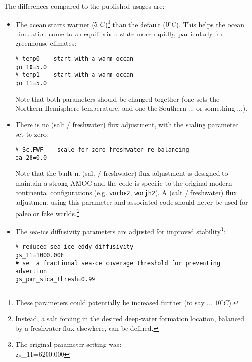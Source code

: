 \begin{itemize}[noitemsep]
The differences compared to the published usages are:
\begin{itemize}[noitemsep]
\vspace{1mm}
\item The ocean starts warmer (\(5^{\circ}C\))\footnote{These parameters could potentially be increased further (to say ...  \(10^{\circ}C\)).} than the default (\(0^{\circ}C\)). This helps the ocean circulation come to an equilibrium state more rapidly, particularly for greenhouse climates:
\small\vspace{-2pt}\begin{verbatim}
# temp0 -- start with a warm ocean
go_10=5.0
# temp1 -- start with a warm ocean
go_11=5.0
\end{verbatim}\vspace{-2pt}\normalsize
Note that both parameters should be changed together (one sets the Northern Hemisphere temperature, and one the Southern ... or something ...).
\vspace{1mm}
\item There is no (salt / freshwater) flux adjustment, with the scaling parameter set to zero:
\small\vspace{-2pt}\begin{verbatim}
# SclFWF -- scale for zero freshwater re-balancing
ea_28=0.0
\end{verbatim}\vspace{-2pt}\normalsize
Note that the built-in (salt / freshwater) flux adjustment is designed to maintain a strong AMOC and the code is specific to the original modern continental configurations (e.g. \texttt{worbe2}, \texttt{worjh2}). A (salt / freshwater) flux adjustment using this parameter and associated code should never be used for paleo or fake worlds.\footnote{Instead, a salt forcing in the desired deep-water formation location, balanced by a freshwater flux elsewhere, can be defined.}
\vspace{1mm}
\item The sea-ice diffusivity parameters are adjusted for improved stability\footnote{The original parameter setting was:
\\gs\_11=6200.000}:
\small\vspace{-2pt}\begin{verbatim}
# reduced sea-ice eddy diffusivity
gs_11=1000.000
# set a fractional sea-ce coverage threshold for preventing advection
gs_par_sica_thresh=0.99
\end{verbatim}\vspace{-2pt}\normalsize
\vspace{1mm}

\end{itemize}
\end{itemize}
